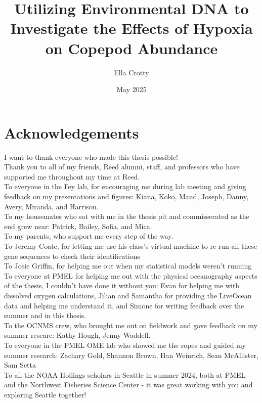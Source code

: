 \documentclass[12pt,twoside]{reedthesis}
\title{Utilizing Environmental DNA to Investigate the Effects of Hypoxia on Copepod Abundance}
\author{Ella Crotty}
\date{May 2025}
\begin{document}
  \maketitle
  \frontmatter %
  \pagestyle{empty} %

    \chapter*{Acknowledgements}
	I want to thank everyone who made this thesis possible! \\
	Thank you to all of my friends, Reed alumni, staff, and professors who have supported me throughout my time at Reed. \\
	To everyone in the Fey lab, for encouraging me during lab meeting and giving feedback on my presentations and figures: Kiana, Koko, Maud, Joseph, Danny, Avery, Miranda, and Harrison. \\
	To my housemates who sat with me in the thesis pit and commisserated as the end grew near: Patrick, Bailey, Sofia, and Mica. \\
	To my parents, who support me every step of the way. \\
	To Jeremy Coate, for letting me use his class's virtual machine to re-run all these gene sequences to check their identifications \\
	To Josie Griffin, for helping me out when my statistical models weren't running \\
	To everyone at PMEL for helping me out with the physical oceanography aspects of the thesis, I couldn't have done it without you: Evan for helping me with dissolved oxygen calculations, Jilian and Samantha for providing the LiveOcean data and helping me understand it, and Simone for writing feedback over the summer and in this thesis. \\
	To the OCNMS crew, who brought me out on fieldwork and gave feedback on my summer researc: Kathy Hough, Jenny Waddell. \\
	To everyone in the PMEL OME lab who showed me the ropes and guided my summer research: Zachary Gold, Shannon Brown, Han Weinrich, Sean McAllister, Sam Setta \\
	To all the NOAA Hollings scholars in Seattle in summer 2024, both at PMEL and the Northwest Fisheries Science Center - it was great working with you and exploring Seattle together! \\

	
\end{document}
